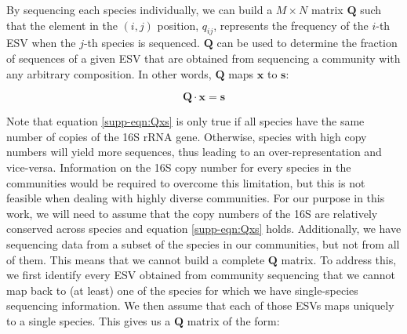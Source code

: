 \documentclass[a4paper,10pt]{article}
\begin{document}
By sequencing each species individually, we can build a $M \times N$ 
matrix $\mathbf{Q}$ such
that the element in the $(i,j)$ position, $q_{ij}$, represents the frequency of
the $i$-th ESV when the $j$-th species is sequenced. $\mathbf{Q}$ can be used
to determine the fraction of sequences of a given ESV that are obtained from
sequencing a community with any arbitrary composition. In other words,
$\mathbf{Q}$ maps $\mathbf{x}$ to $\mathbf{s}$:

\begin{equation}
\mathbf{Q} \cdot \mathbf{x} = \mathbf{s}
\label{supp-eqn:Qxs}
\end{equation}

Note that equation \ref{supp-eqn:Qxs} is only true if all species have the same
number of copies of the 16S rRNA gene. Otherwise, species with high copy numbers
will yield more sequences, thus leading to an over-representation and vice-versa.
Information on the 16S copy number for every species in the communities would be
required to overcome this limitation, but this is not feasible when dealing with
highly diverse communities. For our purpose in this
work, we will need to assume that the copy numbers of the 16S are relatively
conserved across species and equation \ref{supp-eqn:Qxs} holds. Additionally,
we have sequencing data from a subset of the species in our
communities, but not from all of them. This means that we cannot build a complete
$\mathbf{Q}$ matrix. To address this, we first identify every ESV obtained
from community sequencing that we cannot map back to (at least) one of the
species for which we have single-species sequencing information. We then
assume that each
of those ESVs maps uniquely to a single species. This gives us a $\mathbf{Q}$
matrix of the form:
\end{document}
